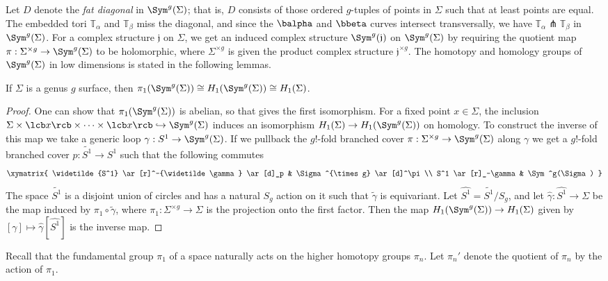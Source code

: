 Let $D$ denote the \emph{fat diagonal} in $\Sym^g(\Sigma)$; that is, $D$ consists of those ordered $g$-tuples of points in $\Sigma$ such that at least points are equal. The embedded tori $\mathbb T_\alpha$ and $\mathbb T_\beta$ miss the diagonal, and since the $\balpha$ and $\bbeta$ curves intersect transversally, we have $\mathbb T_\alpha \pitchfork \mathbb T_\beta$ in $\Sym^g(\Sigma)$. For a complex structure $\mathfrak j$ on $\Sigma$, we get an induced complex structure $\Sym^g(\mathfrak j)$ on $\Sym^g(\Sigma)$ by requiring the quotient map $\pi : \Sigma^{\times g} \rightarrow \Sym^g(\Sigma)$ to be holomorphic, where $\Sigma^{\times g}$ is given the product complex structure $\mathfrak j^{\times g}$. The homotopy and homology groups of $\Sym^g(\Sigma)$ in low dimensions is stated in the following lemmas.
\begin{lem}
If $\Sigma$ is a genus $g$ surface, then $\pi_1(\Sym^g(\Sigma)) \cong H_1(\Sym^g(\Sigma)) \cong H_1(\Sigma)$.
\end{lem}
\begin{proof}
One can show that $\pi_1(\Sym^g(\Sigma))$ is abelian, so that gives the first isomorphism. For a fixed point $x \in \Sigma$, the inclusion $\Sigma \times \lcb x \rcb \times \cdots \times \lcb x \rcb \hookrightarrow \Sym^g(\Sigma)$ induces an isomorphism $H_1(\Sigma) \rightarrow H_1(\Sym^g(\Sigma))$ on homology. To construct the inverse of this map we take a generic loop $\gamma : S^1 \rightarrow \Sym^g(\Sigma)$. If we pullback the $g!$-fold branched cover $\pi : \Sigma^{\times g} \rightarrow \Sym^g(\Sigma)$ along $\gamma$ we get a $g!$-fold branched cover $p : \widetilde{S^1} \rightarrow S^1$ such that the following commutes
\[
\xymatrix
{
	\widetilde{S^1} \ar[r]^-{\widetilde\gamma} \ar[d]_p & \Sigma^{\times g} \ar[d]^\pi \\
	S^1 \ar[r]_-\gamma & \Sym^g(\Sigma)
}
\]
The space $\widetilde{S^1}$ is a disjoint union of circles and has a natural $S_g$ action on it such that $\widetilde\gamma$ is equivariant. Let $\widehat{S^1} = \widetilde{S^1} / S_g$, and let $\widehat\gamma : \widehat{S^1} \rightarrow \Sigma$ be the map induced by $\pi_1 \circ \widetilde\gamma$, where $\pi_1 : \Sigma^{\times g} \rightarrow \Sigma$ is the projection onto the first factor. Then the map $H_1(\Sym^g(\Sigma)) \rightarrow H_1(\Sigma)$ given by $[\gamma] \mapsto \widehat\gamma[\widehat{S^1}]$ is the inverse map.
\end{proof}

Recall that the fundamental group $\pi_1$ of a space naturally acts on the higher homotopy groups $\pi_n$. Let $\pi_n'$ denote the quotient of $\pi_n$ by the action of $\pi_1$.

